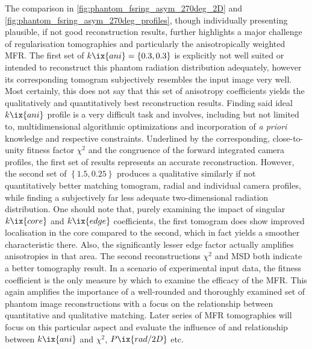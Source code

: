                 The comparison in \cref{fig:phantom_fsring_asym_270deg_2D} and \ref{fig:phantom_fsring_asym_270deg_profiles}, though individually presenting plausible, if not good reconstruction results, further highlights a major challenge of regularisation tomographies and particularly the anisotropically weighted MFR. The first set of $k\ix{ani}=\left\{0.3, 0.3\right\}$ is explicitly not well suited or intended to reconstruct this phantom radiation distribution adequately, however its corresponding tomogram subjectively resembles the input image very well. Most certainly, this does not say that this set of anisotropy coefficients yields the qualitatively and quantitatively best reconstruction results. Finding said ideal $k\ix{ani}$ profile is a very difficult task and involves, including but not limited to, multidimensional algorithmic optimizations and incorporation of \textit{a priori} knowledge and respective constraints. Underlined by the corresponding, close-to-unity fitness factor $\chi^{2}$ and the congruence of the forward integrated camera profiles, the first set of results represents an accurate reconstruction. However, the second set of $\left\{1.5, 0.25\right\}$ produces a qualitative similarly if not quantitatively better matching tomogram, radial and individual camera profiles, while finding a subjectively far less adequate two-dimensional radiation distribution. One should note that, purely examining the impact of singular $k\ix{core}$ and $k\ix{edge}$ coefficients, the first tomogram does show improved localisation in the core compared to the second, which in fact yields a smoother characteristic there. Also, the significantly lesser edge factor actually amplifies anisotropies in that area. The second reconstructions $\chi^{2}$ and MSD both indicate a better tomography result. In a scenario of experimental input data, the fitness coefficient is the only measure by which to examine the efficacy of the MFR. This again amplifies the importance of a well-rounded and thoroughly examined set of phantom image reconstructions with a focus on the relationship between quantitative and qualitative matching. Later series of MFR tomographies will focus on this particular aspect and evaluate the influence of and relationship between $k\ix{ani}$ and $\chi^{2}$, $P\ix{rad/2D}$ etc.\\%
%
                \newline%
